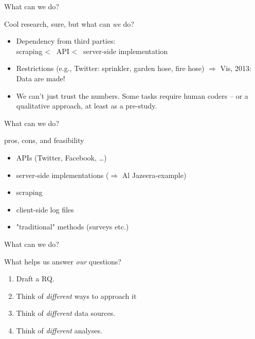 \begin{frame}{What can we do?}
\begin{block}{Cool research, sure, but what can \emph{we} do?}
\begin{itemize}
\item Dependency from third parties: \\ scraping \textless ~ API \textless ~ server-side implementation 
\item Restrictions (e.g., Twitter: sprinkler, garden hose, fire hose) $\Rightarrow$ Vis, 2013: Data are made!
\item We can't just trust the numbers. Some tasks require human coders -- or a qualitative approach, at least as a pre-study.
\end{itemize}
\end{block}
\end{frame}


\begin{frame}{What can we do?}
\begin{block}{pros, cons, and feasibility}
\begin{itemize}
\item APIs (Twitter, Facebook, \dots)
\item server-side implementations ($\Rightarrow$ Al Jazeera-example)
\item scraping
\item client-side log files
\item "traditional" methods (surveys etc.)
\end{itemize}
\end{block}
\end{frame}

\begin{frame}{What can we do?}
\begin{block}{What helps us answer \emph{our} questions?}
\begin{enumerate}
\item Draft a RQ.
\item Think of \emph{different} ways to approach it
\item Think of \emph{different} data sources.
\item Think of \emph{different} analyses.
\end{enumerate}
\end{block}
\end{frame}


